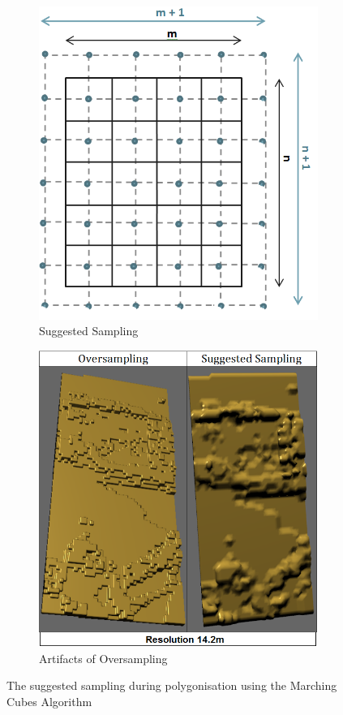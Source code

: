 \documentclass{subfiles}
\begin{document}
    \begin{figure} [h!]
    	\begin{subfigure}[t]{.49\textwidth}
    		
    		\centering
    		\includegraphics[width=.9\textwidth]{img/Sampling}
    		\caption{Suggested Sampling}
    		\label{fig:ExpectedSampling}
    	\end{subfigure} \hfill
    	\begin{subfigure}[t]{.49\textwidth}
    		\centering
    		\includegraphics[width=.9\textwidth]{img/OversamplingVsSuggestedSampling}
    		\caption{Artifacts of Oversampling} 
    		\label{fig:SamplingArtifacts}
    	\end{subfigure} \hfill
    	\caption[Marching Cubes Sampling]{The suggested sampling during polygonisation using the Marching Cubes Algorithm}
    	\label{fig:MCSampling}
    \end{figure}
\end{document}
